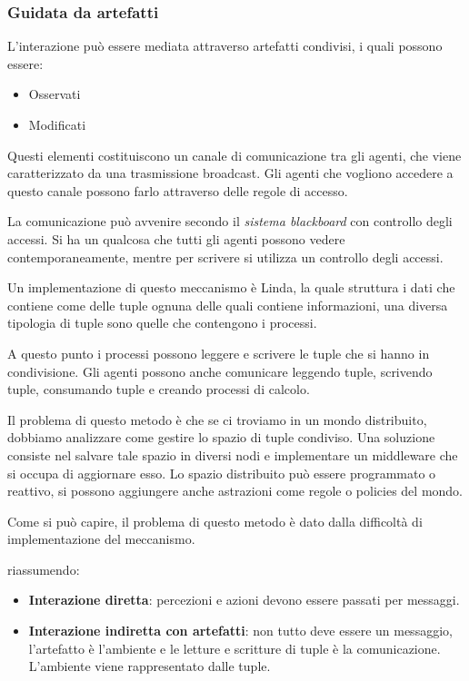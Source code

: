 \subsubsection{Guidata da artefatti}
L'interazione può essere mediata attraverso artefatti condivisi, i quali possono
essere:
\begin{itemize}
    \item Osservati
    \item Modificati
\end{itemize}
Questi elementi costituiscono un canale di comunicazione tra gli agenti, che
viene caratterizzato da una trasmissione broadcast. Gli agenti che vogliono
accedere a questo canale possono farlo attraverso delle regole di accesso.

La comunicazione può avvenire secondo il \textit{sistema blackboard} con
controllo degli accessi. Si ha un qualcosa che tutti gli agenti possono vedere
contemporaneamente, mentre per scrivere si utilizza un controllo degli accessi.

Un implementazione di questo meccanismo è Linda, la quale struttura i dati che
contiene come delle tuple ognuna delle quali contiene informazioni, una diversa
tipologia di tuple sono quelle che contengono i processi.

A questo punto i processi possono leggere e scrivere le tuple che si hanno in
condivisione. Gli agenti possono anche comunicare leggendo tuple, scrivendo tuple,
consumando tuple e creando processi di calcolo.

Il problema di questo metodo è che se ci troviamo in un mondo distribuito,
dobbiamo analizzare come gestire lo spazio di tuple condiviso. Una soluzione
consiste nel salvare tale spazio in diversi nodi e implementare un middleware che
si occupa di aggiornare esso. Lo spazio distribuito può essere programmato o reattivo,
si possono aggiungere anche astrazioni come regole o policies del mondo.

Come si può capire, il problema di questo metodo è dato dalla difficoltà di
implementazione del meccanismo.

riassumendo:
\begin{itemize}
    \item \textbf{Interazione diretta}: percezioni e azioni devono essere passati
          per messaggi.
    \item \textbf{Interazione indiretta con artefatti}:  non tutto deve essere
          un messaggio, l'artefatto è l'ambiente e le letture e scritture di tuple
          è la comunicazione. L'ambiente viene rappresentato dalle tuple.
\end{itemize}
